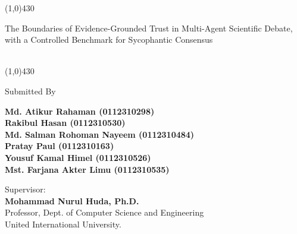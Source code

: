 \begin{titlepage}


    \begin{center}
        \line(1,0){430}\\[0.6em]

        {\LARGE \bf \parbox{\textwidth}{\centering The Boundaries of Evidence-Grounded Trust in Multi-Agent Scientific Debate, with a Controlled Benchmark for Sycophantic Consensus}}
        \\[0.6em]

        \line(1,0){430}

    \end{center}

    \vfill

    \begin{center}
        Submitted
        By
    \end{center}

    \vfill
    \begin{center}
        {\large \bf Md. Atikur Rahaman (0112310298)}\\
        {\large \bf Rakibul Hasan (0112310530)}\\
        {\large \bf Md. Salman Rohoman Nayeem (0112310484)}\\
        {\large \bf Pratay Paul (0112310163)}\\
        {\large \bf Yousuf Kamal Himel (0112310526)}\\
        {\large \bf Mst. Farjana Akter Limu (0112310535)}\\


    \end{center}

    \begin{center}

        Supervisor:\\
        {\large \bf Mohammad Nurul Huda, Ph.D.}\\
        Professor, Dept. of Computer Science and Engineering \\
        United International University.
    \end{center}



\end{titlepage}
